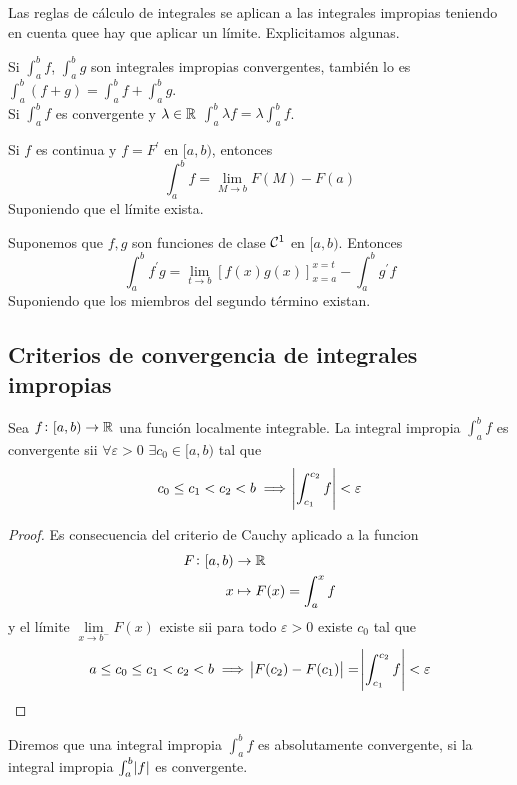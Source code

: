 \begin{obs}
	Las reglas de cálculo de integrales se aplican a las integrales impropias
	teniendo en cuenta quee hay que aplicar un límite. Explicitamos algunas.
\end{obs}

\begin{prop}[Linealidad]
	Si $\int^b_a f$, $\int^b_a g$ son integrales impropias convergentes, tambi\'en
	lo es $\int^b_a (f+g) = \int^b_a f + \int^b_a g$.
	\\
	Si $\int^b_a f$ es convergente y $\lambda \in \mathbb{R}$ $\int^b_a \lambda f =
	\lambda \int^b_a f$.
\end{prop}

\begin{prop}
	Si $f$ es continua y $f = F^\prime$ en $[a,b)$, entonces
	\[
		\int^b_a f = \lim_{M \to b} F(M) - F(a)
	\]
	Suponiendo que el límite exista.
\end{prop}

\begin{prop}
	Suponemos que $f,g$ son funciones de clase $\mathcal{C}^1$ en $[a,b)$. Entonces
	\[
		\int^b_a f^\prime g = \lim_{t \to b} \left[ f(x)g(x)\right]^{x=t}_{x=a}
		- \int^b_a g^\prime f
	\]
	Suponiendo que los miembros del segundo t\'ermino existan.
\end{prop}

\subsection{Criterios de convergencia de integrales impropias}

\begin{prop}
	Sea $f \colon [a,b) \to \mathbb{R}$ una función localmente integrable. La integral
	impropia $\int^b_a f$ es convergente sii $\forall \varepsilon > 0$ $\exists c_0
	\in [a,b)$ tal que
	\[
		c_0 \leq c_1 < c_2 < b \implies \abs{\int^{c_2}_{c_1} f} < \varepsilon
	\]
\end{prop}
\begin{proof}
	Es consecuencia del criterio de Cauchy aplicado a la funcion
	\[\begin{aligned}
		F \colon [a,b) &\to \mathbb{R} \\
		x &\mapsto F(x) = \int^x_a f
	\end{aligned}\]
	y el límite $\lim\limits_{x \to b^-}F(x)$ existe sii para todo $\varepsilon >0$
	existe $c_0$ tal que
	\[
		a \leq c_0 \leq c_1 < c_2 < b \implies\abs{F(c_2)-F(c_1)} =
		\abs{\int^{c_2}_{c_1} f} < \varepsilon		
	\]
\end{proof}

\begin{defi}
	Diremos que una integral impropia $\int^b_a f$ es absolutamente convergente,
	si la integral impropia $\int^b_a \abs{f}$ es convergente.
\end{defi}
